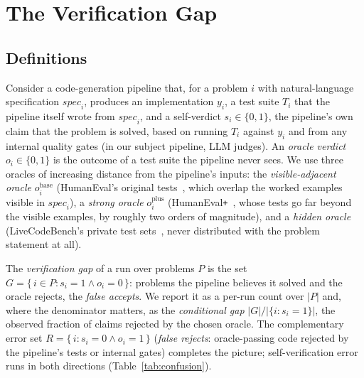 \documentclass{article}
\begin{document}
\section{The Verification Gap}
\label{sec:gap}


\subsection{Definitions}

Consider a code-generation pipeline that, for a problem $i$ with natural-language
specification $\mathit{spec}_i$, produces an implementation $y_i$, a test suite $T_i$ that the
pipeline itself wrote from $\mathit{spec}_i$, and a self-verdict
$s_i \in \{0,1\}$, the pipeline's own claim that the problem is solved, based on running
$T_i$ against $y_i$ and from any internal quality gates (in our subject pipeline, LLM judges).
An \emph{oracle verdict} $o_i \in \{0,1\}$ is the outcome of a test suite the pipeline never
sees. We use three oracles of increasing distance from the pipeline's inputs: the
\emph{visible-adjacent oracle} $o^{\mathrm{base}}_i$ (HumanEval's original tests~\cite{chen2021humaneval}, which
overlap the worked examples visible in $\mathit{spec}_i$), a \emph{strong oracle}
$o^{\mathrm{plus}}_i$ (HumanEval\texttt{+}~\cite{liu2023evalplus}, whose tests go far beyond
the visible examples, by roughly two orders of magnitude), and a \emph{hidden oracle}
(LiveCodeBench's private test sets~\cite{jain2024livecodebench}, never distributed with the
problem statement at all).

The \emph{verification gap} of a run over problems $P$ is the set
$G = \{\, i \in P : s_i = 1 \wedge o_i = 0 \,\}$: problems the pipeline believes it solved and
the oracle rejects, the \emph{false accepts}. We report it as a per-run count over $|P|$ and,
where the denominator matters, as the \emph{conditional gap} $|G| / |\{ i : s_i = 1 \}|$, the
observed fraction of claims rejected by the chosen oracle. The complementary error set
$R = \{\, i : s_i = 0 \wedge o_i = 1 \,\}$ (\emph{false rejects}: oracle-passing code rejected by the
pipeline's tests or internal gates) completes the picture; self-verification error runs in both directions
(Table~\ref{tab:confusion}).
\end{document}
